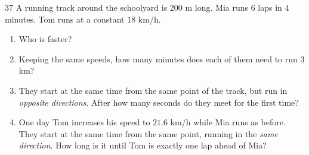 \begin{probbox}{37}{}
A running track around the schoolyard is $200$ m long. Mia runs $6$ laps in $4$ minutes. Tom runs at a constant $18$ km/h.
\begin{enumerate}[label=\alph*),leftmargin=1.6em,itemsep=0pt,topsep=2pt]
  \item Who is faster?
  \item Keeping the same speeds, how many minutes does each of them need to run $3$ km?
  \item They start at the same time from the same point of the track, but run in \emph{opposite directions}. After how many
  seconds do they meet for the first time?
  \item One day Tom increases his speed to $21.6$ km/h while Mia runs as before. They start at the same time from the same
  point, running in the \emph{same direction}. How long is it until Tom is exactly one lap ahead of Mia?
\end{enumerate}
\end{probbox}
